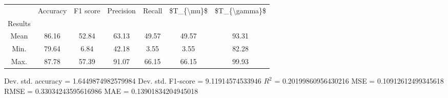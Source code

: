 \begin{tabular}{|c|c|c|c|c|c|c|}
\toprule
{} &  Accuracy &  F1 score &  Precision &  Recall &  \$T\_\{\textbackslash mu\}\$ &  \$T\_\{\textbackslash gamma\}\$ \\
Results &           &           &            &         &            &               \\
\hline
Mean    &     86.16 &     52.84 &      63.13 &   49.57 &      49.57 &         93.31 \\
Min.    &     79.64 &      6.84 &      42.18 &    3.55 &       3.55 &         82.28 \\
Max.    &     87.78 &     57.39 &      91.07 &   66.15 &      66.15 &         99.93 \\
\bottomrule
\end{tabular}

 Dev. std. accuracy = 1.6449874982579984
 Dev. std. F1-score = 9.11914574533946
 $R^2$ = 0.20199860956430216
 MSE = 0.10912612499345618
 RMSE = 0.33034243595616986
 MAE = 0.13901834204945018